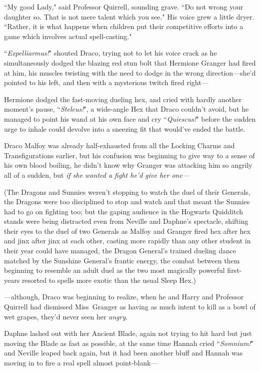 ``My good Lady," said Professor Quirrell, sounding grave. ``Do not wrong your daughter so. That is not mere talent which you see." His voice grew a little dryer. ``Rather, it is what happens when children put their competitive efforts into a game which involves actual spell-casting."

\later

``\emph{Expelliarmus!}" shouted Draco, trying not to let his voice crack as he simultaneously dodged the blazing red stun bolt that Hermione Granger had fired at him, his muscles twisting with the need to dodge in the wrong direction—she'd pointed to his left, and then with a mysterious twitch fired right—

Hermione dodged the fast-moving dueling hex, and cried with hardly another moment's pause, ``\emph{Steleus!}", a wide-angle Hex that Draco couldn't avoid, but he managed to point his wand at his own face and cry ``\emph{Quiescus!}" before the sudden urge to inhale could devolve into a sneezing fit that would've ended the battle.

Draco Malfoy was already half-exhausted from all the Locking Charms and Transfigurations earlier, but his confusion was beginning to give way to a sense of his own blood boiling, he didn't know why Granger was attacking him so angrily all of a sudden, but \emph{if she wanted a fight he'd give her one—}

(The Dragons and Sunnies weren't stopping to watch the duel of their Generals, the Dragons were too disciplined to stop and watch and that meant the Sunnies had to go on fighting too; but the gaping audience in the Hogwarts Quidditch stands were being distracted even from Neville and Daphne's spectacle, shifting their eyes to the duel of two Generals as Malfoy and Granger fired hex after hex and jinx after jinx at each other, casting more rapidly than any other student in their year could have managed, the Dragon General's trained dueling dance matched by the Sunshine General's frantic energy, the combat between them beginning to resemble an adult duel as the two most magically powerful first-years resorted to spells more exotic than the usual Sleep Hex.)

—although, Draco was beginning to realize, when he and Harry and Professor Quirrell had dismissed Miss~Granger as having as much intent to kill as a bowl of wet grapes, they'd never seen her \emph{angry}.

\later

Daphne lashed out with her Ancient Blade, again not trying to hit hard but just moving the Blade as fast as possible, at the same time Hannah cried ``\emph{Somnium!}" and Neville leaped back again, but it had been another bluff and Hannah was moving in to fire a real spell almost point-blank—

